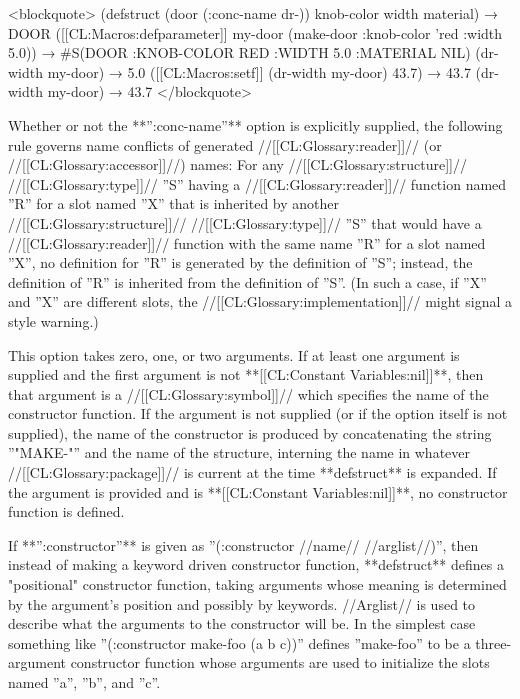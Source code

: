 <blockquote> (defstruct (door (:conc-name dr-)) knob-color width material) → DOOR ([[CL:Macros:defparameter]] my-door (make-door :knob-color 'red :width 5.0)) → #S(DOOR :KNOB-COLOR RED :WIDTH 5.0 :MATERIAL NIL) (dr-width my-door) → 5.0 ([[CL:Macros:setf]] (dr-width my-door) 43.7) → 43.7 (dr-width my-door) → 43.7 </blockquote>

Whether or not the **'':conc-name''** option is explicitly supplied, the following rule governs name conflicts of generated //[[CL:Glossary:reader]]// (or //[[CL:Glossary:accessor]]//) names: For any //[[CL:Glossary:structure]]// //[[CL:Glossary:type]]// ''S'' having a //[[CL:Glossary:reader]]// function named ''R'' for a slot named ''X'' that is inherited by another //[[CL:Glossary:structure]]// //[[CL:Glossary:type]]// ''S'' that would have a //[[CL:Glossary:reader]]// function with the same name ''R'' for a slot named ''X'', no definition for ''R'' is generated by the definition of ''S''; instead, the definition of ''R'' is inherited from the definition of ''S''. (In such a case, if ''X'' and ''X'' are different slots, the //[[CL:Glossary:implementation]]// might signal a style warning.)


This option takes zero, one, or two arguments. If at least one argument is supplied and the first argument is not **[[CL:Constant Variables:nil]]**, then that argument is a //[[CL:Glossary:symbol]]// which specifies the name of the constructor function. If the argument is not supplied (or if the option itself is not supplied), the name of the constructor is produced by concatenating the string ''"MAKE-"'' and the name of the structure, interning the name in whatever //[[CL:Glossary:package]]// is current at the time **defstruct** is expanded. If the argument is provided and is **[[CL:Constant Variables:nil]]**, no constructor function is defined.

If **'':constructor''** is given as ''(:constructor //name// //arglist//)'', then instead of making a keyword driven constructor function, **defstruct** defines a "positional" constructor function, taking arguments whose meaning is determined by the argument's position and possibly by keywords. //Arglist// is used to describe what the arguments to the constructor will be. In the simplest case something like ''(:constructor make-foo (a b c))'' defines ''make-foo'' to be a three-argument constructor function whose arguments are used to initialize the slots named ''a'', ''b'', and ''c''.

